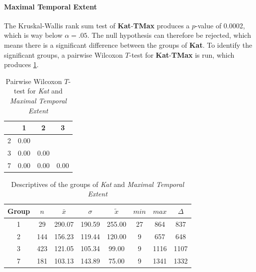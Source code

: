 \paragraph{Maximal Temporal Extent}
The Kruskal-Wallis rank sum test of \textbf{Kat}-\textbf{TMax} produces a $p$-value of 0.0002, which is way below $\alpha=.05$. The null hypothesis can therefore be rejected, which means there is a significant difference between the groups of \textbf{Kat}. To identify the significant groups, a pairwise Wilcoxon $T$-test for \textbf{Kat}-\textbf{TMax} is run, which produces \cref{tbl:wilcoxon_baysis_initiator_Kat_TMax}. 
\begin{table}[ht]
	\centering
	\begin{tabular}{c|c|c|c}
		\toprule  
  		& 1 & 2 & 3 \\ 
  		\midrule    
        2 & 0.00 &  &  \\ 
        3 & 0.00 & 0.00 &  \\ 
        7 & 0.00 & 0.00 & 0.00 \\ 
 		\bottomrule
	\end{tabular}
    \caption{Pairwise Wilcoxon $T$-test for \textit{Kat} and \textit{Maximal Temporal Extent}}
    \label{tbl:wilcoxon_baysis_initiator_Kat_TMax}
\end{table}
\begin{table}[ht]
	\centering
	\begin{tabular}{c|c|c|c|c|c|c|c}
		\toprule  
		Group & $n$ & $\bar{x}$ & $\sigma$ & $\tilde{x}$ & $min$ & $max$ & $\Delta$ \\
        \midrule
        1 & 29  & 290.07 & 190.59 & 255.00 & 27 & 864  & 837 \\ 
        2 & 144 & 156.23 & 119.44 & 120.00 & 9  & 657  & 648 \\ 
        3 & 423 & 121.05 & 105.34 & 99.00  & 9  & 1116 & 1107 \\ 
        7 & 181 & 103.13 & 143.89 & 75.00  & 9  & 1341 & 1332 \\ 
 		\bottomrule
	\end{tabular}
    \caption{Descriptives of the groups of \textit{Kat} and \textit{Maximal Temporal Extent}}
    \label{tbl:descriptives_baysis_initiator_Kat_TMax}
\end{table}

